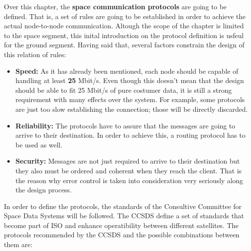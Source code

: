 Over this chapter, the \textbf{space communication protocols} are going to be defined. That is, a set of rules are going to be established in order to achieve the actual node-to-node communication. Altough the scope of the chapter is limited to the space segment, this inital introduction on the protocol definition is usfeul for the ground segment.
Having said that, several factors constrain the design of this relation of rules:

\begin{itemize}
\renewcommand{\labelitemi}{\scriptsize$\blacksquare$} 
\item \textbf{Speed:} As it has already been mentioned, each node should be capable of handling at least \textbf{25} Mbit/s. Even though this doesn't mean that the design should be able to fit 25 Mbit/s of pure costumer data, it is still a strong requirement with many effects over the system. For example, some protocols are just too slow establishing the connection; those will be directly discarded.

\item \textbf{Reliability:} The protocols have to assure that the messages are going to arrive to their destination. In order to achieve this, a routing protocol has to be used as well.


\item \textbf{Security:} Messages are not just required to arrive to their destination but they also must be ordered and coherent when they reach the client. That is the reason why error control is taken into consideration very seriously along the design process.
\end{itemize}
In order to define the protocols, the standards of the Consultive Committee for Space Data Systems will be followed. The CCSDS define a set of standards that become part of ISO and enhance operatibility between different satellites. The protocols recommended by the CCSDS and the possible combinations between them are:
